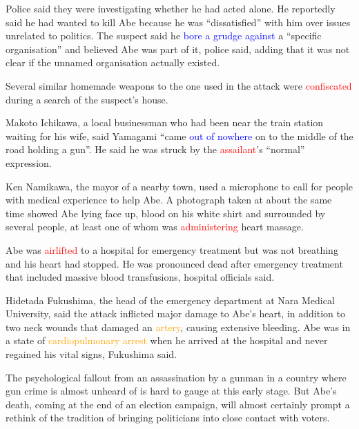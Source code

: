 \documentclass[12pt,a4paper]{article}
\begin{document}
    \par Police said they were investigating whether he had acted alone. He reportedly said he had wanted to kill Abe because he was “dissatisfied” with him over issues unrelated to politics. The suspect said he \textcolor{blue}{bore a grudge against} \cite{bore_grudge_against} a “specific organisation” and believed Abe was part of it, police said, adding that it was not clear if the unnamed organisation actually existed.

    \par Several similar homemade weapons to the one used in the attack were \textcolor{red}{confiscated} \cite{confiscated} during a search of the suspect’s house.

    \par Makoto Ichikawa, a local businessman who had been near the train station waiting for his wife, said Yamagami “came \textcolor{blue}{out of nowhere} \cite{out_of_nowhere} on to the middle of the road holding a gun”. He said he was struck by the \textcolor{red}{assailant}\cite{assailant}’s “normal” expression.

    \par Ken Namikawa, the mayor of a nearby town, used a microphone to call for people with medical experience to help Abe. A photograph taken at about the same time showed Abe lying face up, blood on his white shirt and surrounded by several people, at least one of whom was \textcolor{red}{administering} \cite{administering} heart massage.

    \par Abe was \textcolor{red}{airlifted}\cite{airlifted} to a hospital for emergency treatment but was not breathing and his heart had stopped. He was pronounced dead after emergency treatment that included massive blood transfusions, hospital officials said.

    \par Hidetada Fukushima, the head of the emergency department at Nara Medical University, said the attack inflicted major damage to Abe’s heart, in addition to two neck wounds that damaged an \textcolor{orange}{artery}\cite{artery}, causing extensive bleeding. Abe was in a state of \textcolor{orange}{cardiopulmonary arrest} \cite{cardiopulmonary_arrest} when he arrived at the hospital and never regained his vital signs, Fukushima said.

    \par The psychological fallout from an assassination by a gunman in a country where gun crime is almost unheard of is hard to gauge at this early stage. But Abe’s death, coming at the end of an election campaign, will almost certainly prompt a rethink of the tradition of bringing politicians into close contact with voters.
\end{document}
